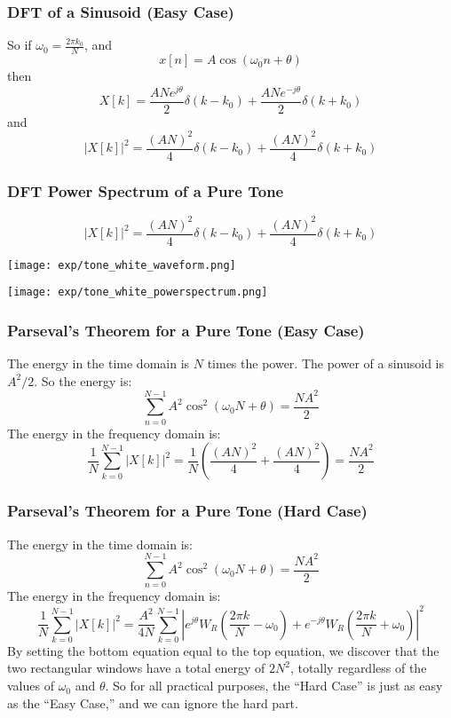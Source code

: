\documentclass{beamer}
\begin{document}
\begin{frame}
  \frametitle{DFT of a Sinusoid (Easy Case)}
  So if $\omega_0=\frac{2\pi k_0}{N}$, and 
  \[
  x[n] = A\cos(\omega_0 n+\theta)
  \]
  then
  \[
  X[k] = \frac{ANe^{j\theta}}{2}\delta(k-k_0)+\frac{ANe^{-j\theta}}{2}\delta(k+k_0)
  \]
  and
  \[
  |X[k]|^2 = \frac{(AN)^2}{4}\delta(k-k_0)+\frac{(AN)^2}{4}\delta(k+k_0)
  \]
\end{frame}

\begin{frame}
  \frametitle{DFT Power Spectrum of a Pure Tone}
  \[
  |X[k]|^2 = \frac{(AN)^2}{4}\delta(k-k_0)+\frac{(AN)^2}{4}\delta(k+k_0)
  \]
  \centerline{\texttt{[image: exp/tone\_white\_waveform.png]}}
  \centerline{\texttt{[image: exp/tone\_white\_powerspectrum.png]}}
\end{frame}

\begin{frame}
  \frametitle{Parseval's Theorem for a Pure Tone (Easy Case)}

  The energy in the time domain is $N$ times the power.  The power of
  a sinusoid is $A^2/2$.  So the energy is:
  \[
  \sum_{n=0}^{N-1} A^2\cos^2\left(\omega_0 N+\theta\right) = \frac{NA^2}{2}
  \]
  The energy in the frequency domain is:
  \[
  \frac{1}{N}\sum_{k=0}^{N-1} |X[k]|^2 =
  \frac{1}{N}\left(\frac{(AN)^2}{4}+\frac{(AN)^2}{4}\right) =\frac{NA^2}{2}
  \]
\end{frame}

\begin{frame}
  \frametitle{Parseval's Theorem for a Pure Tone (Hard Case)}

  The energy in the time domain is:
  \[
  \sum_{n=0}^{N-1} A^2\cos^2\left(\omega_0 N+\theta\right) = \frac{NA^2}{2}
  \]
  The energy in the frequency domain is:
  \[
  \frac{1}{N}\sum_{k=0}^{N-1} |X[k]|^2 =
  \frac{A^2}{4N}\sum_{k=0}^{N-1}\left|
  e^{j\theta}W_R\left(\frac{2\pi k}{N}-\omega_0\right)+
  e^{-j\theta}W_R\left(\frac{2\pi k}{N}+\omega_0\right)\right|^2
  \]
  By setting the bottom equation equal to the top equation, we discover that
  the two rectangular windows have a total energy of $2N^2$, totally regardless of the values
  of $\omega_0$ and $\theta$.  So for all practical purposes, the ``Hard Case''
  is just as easy as the ``Easy Case,'' and we can ignore the hard part.
\end{frame}
\end{document}
